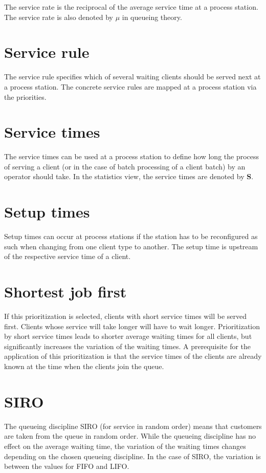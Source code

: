 The service rate is the reciprocal of the average service time at a process station.
The service rate is also denoted by $\mu$ in queueing theory.

\section*{Service rule}


The service rule specifies which of several waiting clients should be served next
at a process station. The concrete service
rules are mapped at a process station via the priorities.

\section*{Service times}


The service times can be used at a process station to define how long
the process of serving a client (or in the case of batch processing of a client batch) by an operator should take.
In the statistics view, the service times are denoted by \textbf{S}.

\section*{Setup times}


Setup times can occur at process stations if the station
has to be reconfigured as such when changing from one client type to another.
The setup time is upstream of the respective service time of a client.

\section*{Shortest job first}


If this prioritization is selected, clients with short service times will be served first.
Clients whose service will take longer will have to wait longer. Prioritization by
short service times leads to shorter average waiting times for all clients, but significantly
increases the variation of the waiting times. A prerequisite for the application of this
prioritization is that the service times of the clients are already known at the time
when the clients join the queue.

\section*{SIRO}


The queueing discipline SIRO (for service in random order) means that customers are taken from the queue in random order.
While the queueing discipline has no effect on the average waiting time, the variation
of the waiting times changes depending on the chosen queueing discipline.
In the case of SIRO, the variation is between the values for FIFO and LIFO.

